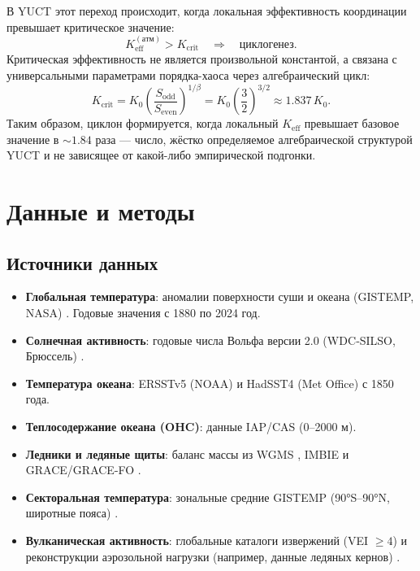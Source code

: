 \documentclass[12pt,a4paper]{article}
\newcommand{\Keff}{K_{\mathrm{eff}}}
\begin{document}
	В YUCT этот переход происходит, когда локальная эффективность координации превышает критическое значение:
	\begin{equation}
		\Keff^{\mathrm{(атм)}} > K_{\mathrm{crit}} \quad \Longrightarrow \quad
		\text{циклогенез}.
	\end{equation}
	Критическая эффективность не является произвольной константой, а связана с универсальными параметрами порядка-хаоса через алгебраический цикл:
	\begin{equation}
		K_{\mathrm{crit}} = K_0 \left( \frac{S_{\mathrm{odd}}}{S_{\mathrm{even}}} \right)^{1/\beta}
		= K_0 \left( \frac{3}{2} \right)^{3/2} \approx 1.837\,K_0 .
	\end{equation}
	Таким образом, циклон формируется, когда локальный $K_{\mathrm{eff}}$ превышает базовое значение в $\sim 1.84$ раза — число, жёстко определяемое алгебраической структурой YUCT и не зависящее от какой-либо эмпирической подгонки.
	
	\section{Данные и методы}
	
	\subsection{Источники данных}
	
	\begin{itemize}
		\item \textbf{Глобальная температура}: аномалии поверхности суши и океана (GISTEMP, NASA) \cite{GISTEMP}. Годовые значения с 1880 по 2024 год.
		\item \textbf{Солнечная активность}: годовые числа Вольфа версии 2.0 (WDC‑SILSO, Брюссель) \cite{SILSO}.
		\item \textbf{Температура океана}: ERSSTv5 (NOAA) и HadSST4 (Met Office) \cite{ERSST, HADSST} с 1850 года.
		\item \textbf{Теплосодержание океана (OHC)}: данные IAP/CAS \cite{IAPOHC} (0–2000 м).
		\item \textbf{Ледники и ледяные щиты}: баланс массы из WGMS \cite{WGMS}, IMBIE \cite{IMBIE} и GRACE/GRACE-FO \cite{GRACE}.
		\item \textbf{Секторальная температура}: зональные средние GISTEMP (90°S–90°N, широтные пояса) \cite{GISTEMPZonal}.
		\item \textbf{Вулканическая активность}: глобальные каталоги извержений (VEI \(\ge 4\)) и реконструкции аэрозольной нагрузки (например, данные ледяных кернов) \cite{VolcanoCatalog}.
	\end{itemize}
	
\end{document}
